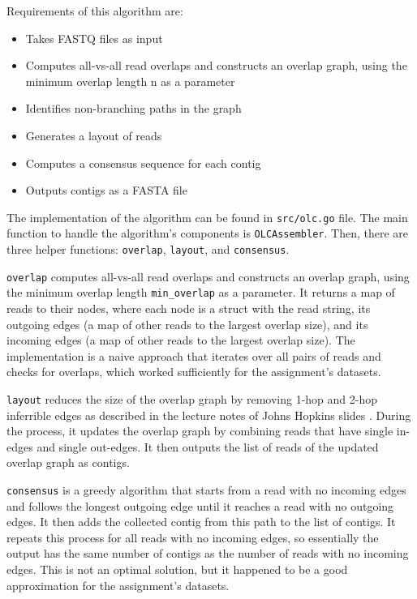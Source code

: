 \documentclass[12pt]{article}
\begin{document}
Requirements of this algorithm are:
\begin{itemize}
    \item Takes FASTQ files as input
    \item Computes all-vs-all read overlaps and constructs an overlap graph,
    using the minimum overlap length n as a parameter
    \item Identifies non-branching paths in the graph
    \item Generates a layout of reads
    \item Computes a consensus sequence for each contig
    \item Outputs contigs as a FASTA file
\end{itemize}

The implementation of the algorithm can be found in \texttt{src/olc.go} file. The main function to handle the algorithm's components is \texttt{OLCAssembler}. Then, there are three helper functions: \texttt{overlap}, \texttt{layout}, and \texttt{consensus}.

\texttt{overlap} computes all-vs-all read overlaps and constructs an overlap graph, using the minimum overlap length \texttt{min\_overlap} as a parameter. It returns a map of reads to their nodes, where each node is a struct with the read string, its outgoing edges (a map of other reads to the largest overlap size), and its incoming edges (a map of other reads to the largest overlap size).
The implementation is a naive approach that iterates over all pairs of reads and checks for overlaps, which worked sufficiently for the assignment's datasets.

\texttt{layout} reduces the size of the overlap graph by removing 1-hop and 2-hop inferrible edges as described in the lecture notes of Johns Hopkins slides \cite{olc_lecture_notes}. During the process, it updates the overlap graph by combining reads that have single in-edges and single out-edges. It then outputs the list of reads of the updated overlap graph as contigs.

\texttt{consensus} is a greedy algorithm that starts from a read with no incoming edges and follows the longest outgoing edge until it reaches a read with no outgoing edges. It then adds the collected contig from this path to the list of contigs. It repeats this process for all reads with no incoming edges, so essentially the output has the same number of contigs as the number of reads with no incoming edges. This is not an optimal solution, but it happened to be a good approximation for the assignment's datasets.
\end{document}
